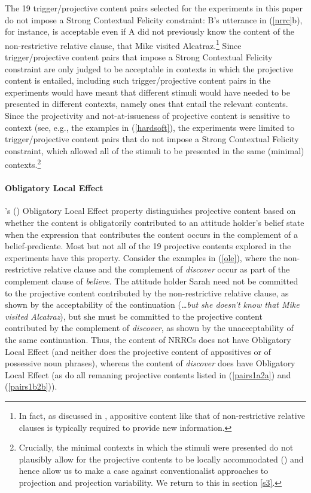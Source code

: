 \documentclass[11pt,fleqn]{article}
\newcommand{\6}{\mbox{$[\hspace*{-.6mm}[$}}
\newcommand{\9}{\mbox{$]\hspace*{-.6mm}]$}}
\newcommand{\citetpos}[1]{\citeauthor{#1}'s (\citeyear{#1})}
\begin{document}
The 19 trigger/projective content pairs selected for the experiments in this paper do not impose a Strong Contextual Felicity constraint: B's utterance in (\ref{nrrc}b), for instance, is acceptable even if A did not previously know the content of the non-restrictive relative clause, that Mike visited Alcatraz.\footnote{In fact, as discussed in \citealt{potts05}, appositive content like that of non-restrictive relative clauses is typically required to provide new information.} Since trigger/projective content pairs that impose a Strong Contextual Felicity constraint are only judged to be acceptable in contexts in which the projective content is entailed, including such trigger/projective content pairs in the experiments would have meant that different stimuli would have needed to be presented in different contexts, namely ones that entail the relevant contents. Since the projectivity and not-at-issueness of projective content is sensitive to context (see, e.g., the examples in (\ref{hardsoft}), the experiments were limited to trigger/projective content pairs that do not impose a Strong Contextual Felicity constraint, which allowed all of the stimuli to be presented in the same (minimal) contexts.\footnote{Crucially, the minimal contexts in which the stimuli were presented do not plausibly allow for the projective contents to be locally accommodated (\citealt{heim83,vds92}) and hence allow us to make a case against conventionalist approaches to projection and projection variability. We return to this in section \ref{s3}.}

\paragraph{Obligatory Local Effect} \citetpos{brst-lang11} Obligatory Local Effect property distinguishes projective content based on whether the content is obligatorily contributed to an attitude holder's belief state when the expression that contributes the content occurs in the complement of a belief-predicate. Most but not all of the 19 projective contents explored in the experiments have this property. Consider the examples in (\ref{ole}), where the non-restrictive relative clause and the complement of {\em discover} occur as part of the complement clause of {\em believe}. The attitude holder Sarah need not be committed to the projective content contributed by the non-restrictive relative clause, as shown by the acceptability of the continuation ({\em \ldots but she doesn't know that Mike visited Alcatraz}), but she must be committed to the projective content contributed by the complement of {\em discover}, as shown by the unacceptability of the same continuation. Thus, the content of NRRCs does not have Obligatory Local Effect (and neither does the projective content of appositives or of possessive noun phrases), whereas the content of {\em discover} does have Obligatory Local Effect (as do all remaning projective contents listed in (\ref{pairs1a2a}) and (\ref{pairs1b2b})).
\end{document}
